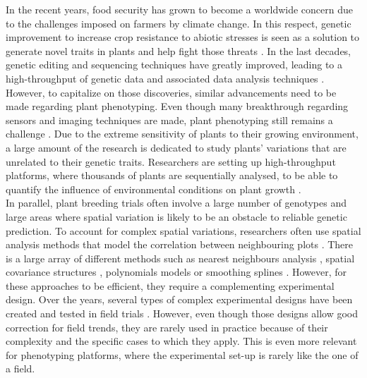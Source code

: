 
In the recent years, food security has grown to become a worldwide concern due to the challenges imposed on farmers by climate change. 
In this respect, genetic improvement to increase crop resistance to abiotic stresses is seen as a solution to generate novel traits in plants and help fight those threats \parencite{tester2010breeding}. 
In the last decades, genetic editing and sequencing techniques have greatly improved, leading to a high-throughput of genetic data and associated data analysis techniques \parencite{schiml2016revolutionizing}. 
However, to capitalize on those discoveries, similar advancements need to be made regarding plant phenotyping. 
Even though many breakthrough regarding sensors and imaging techniques are made, plant phenotyping still remains a challenge \parencite{furbank_phenomics_2011}. Due to the extreme sensitivity of plants to their growing environment, a large amount of the research is dedicated to study plants' variations that are unrelated to their genetic traits. Researchers are setting up high-throughput platforms, where thousands of plants are sequentially analysed, to be able to quantify the influence of environmental conditions on plant growth \parencite{tardieu_plant_2017}.\\

In parallel, plant breeding trials often involve a large number of genotypes and large areas where spatial variation is likely to be an obstacle to reliable genetic prediction. To account for complex spatial variations, researchers often use spatial analysis methods that model the correlation between neighbouring plots \parencite{velazco_modelling_2017}. There is a large array of different methods such as nearest neighbours analysis \parencite{wilkinson_nearest_1983}, spatial covariance structures \parencite{gilmour_accounting_1997,piepho_linear_2010}, polynomials models \parencite{federer1998recovery} or smoothing splines \parencite{durban_adjusting_2001}. However, for these approaches to be efficient, they require a complementing experimental design. Over the years, several types of complex experimental designs have been created and tested in field trials \parencite{yates_comparative_1939,patterson_efficiency_1983,cullis_design_2006}. However, even though those designs allow good correction for field trends, they are rarely used in practice because of their complexity and the specific cases to which they apply. This is even more relevant for phenotyping platforms, where the experimental set-up is rarely like the one of a field.\\ 

